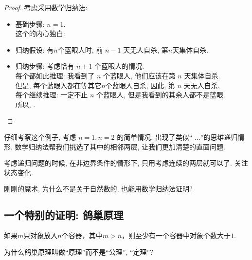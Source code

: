 \begin{proof}
考虑采用数学归纳法: 
\begin{itemize}
      \item 基础步骤: $n = 1$. \\ 
        这个的内心独白:  
      \item 归纳假设: 有$n$个蓝眼人时, 前 $n-1$ 天无人自杀, 第$n$天集体自杀. 
      \item 归纳步骤: 考虑恰有 $n+1$ 个蓝眼人的情况.   \\
        每个都如此推理: 我看到了 $n$ 个蓝眼人, 他们应该在第 $n$ 天集体自杀. 
         \\
        但是, 每个蓝眼人都在等其它$n$个蓝眼人自杀, 因此, 第 $n$ 天无人自杀. 
         \\
        每个继续推理: 一定不止 $n$ 个蓝眼人, 但是我看到的其余人都不是蓝眼. 
         \\
        所以, . 
\end{itemize}
\end{proof}

仔细考察这个例子, 考虑 $n = 1, n = 2$ 的简单情况, 出现了类似`` $\dots$''的思维递归情形. 数学归纳法帮我们挑选了其中的相邻两层, 让我们更加清楚的直面问题. 

\begin{idea}
	考虑递归问题的时候, 在非边界条件的情形下, 只用考虑连续的两层就可以了. 关注状态变化.
\end{idea}

\begin{bonus}
	刚刚的魔术, 为什么不是关于自然数的, 也能用数学归纳法证明? 
\end{bonus}

\subsection*{一个特别的证明: 鸽巢原理}

\begin{theorem}
	如果$m$只对象放入$n$个容器，其中$m>n$，则至少有一个容器中对象个数大于$1$. 
\end{theorem}

\begin{bonus}
	为什么鸽巢原理叫做``原理''而不是``公理'', ``定理''?
\end{bonus}


